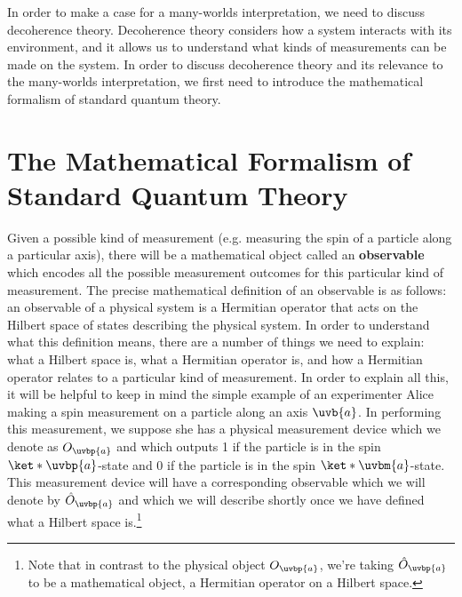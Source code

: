 \documentclass[12pt]{report}
\begin{document}
    In order to make a case for a many-worlds interpretation, we need to discuss decoherence theory. Decoherence theory considers how a system interacts with its environment, and it allows us to understand what kinds of measurements can be made on the system. In order to discuss decoherence theory and its relevance to the many-worlds interpretation, we first need to introduce the mathematical formalism of standard quantum theory.
   

\section{The Mathematical Formalism of Standard Quantum Theory}
Given a possible kind of measurement (e.g. measuring the spin of a particle along a particular axis), there will be a mathematical object called an \textbf{observable} which encodes all the possible measurement outcomes for this particular kind of measurement. The precise mathematical definition of an observable is as follows: an observable of a physical system is a Hermitian operator that acts on the Hilbert space of states describing the physical system. In order to understand what this definition means, there are a number of things we need to explain: what a Hilbert space is, what a Hermitian operator is, and how a Hermitian operator relates to a particular kind of measurement. In order to explain all this, it will be helpful to keep in mind the simple example of an experimenter Alice making a spin measurement on a particle along an axis $\uvb{a}$. In performing this measurement, we suppose she has a physical measurement device which we denote as $O_{\uvbp{a}}$ %
%
and which outputs 1 if the particle is in the spin $\ket*{\uvbp{a}}$-state and 0 if the particle is in the spin $\ket*{\uvbm{a}}$-state. This measurement device will have a corresponding observable which we will denote by $\hat{O}_{\uvbp{a}}$ %
%
and which we will describe shortly once we have defined what a Hilbert space is.\footnote{Note that in contrast to the physical object $O_{\uvbp{a}}$, we're taking $\hat{O}_{\uvbp{a}}$ to be a mathematical object, a Hermitian operator on a Hilbert space.}  
\end{document}
